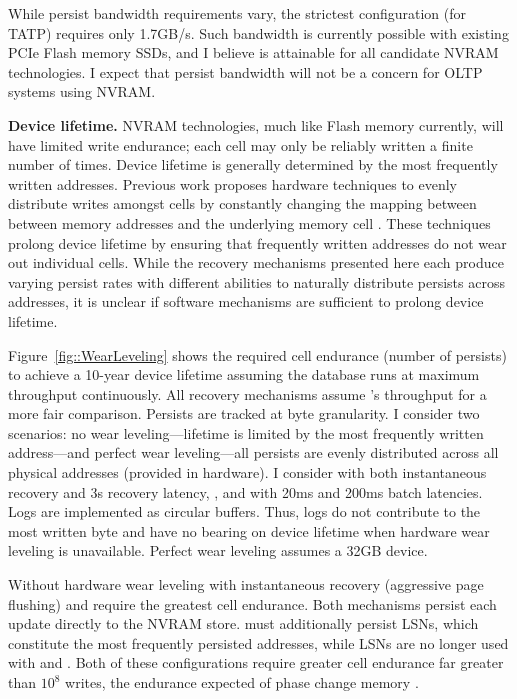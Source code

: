 While persist bandwidth requirements vary, the strictest configuration (\NVDisk for TATP) requires only 1.7GB/s.
Such bandwidth is currently possible with existing PCIe Flash memory SSDs, and I believe is attainable for all candidate NVRAM technologies.
I expect that persist bandwidth will not be a concern for OLTP systems using NVRAM.

\textbf{Device lifetime.}
NVRAM technologies, much like Flash memory currently, will have limited write endurance; each cell may only be reliably written a finite number of times.
Device lifetime is generally determined by the most frequently written addresses.
Previous work proposes hardware techniques to evenly distribute writes amongst cells by constantly changing the mapping between between memory addresses and the underlying memory cell \cite{QureshiKaridis09}.
These techniques prolong device lifetime by ensuring that frequently written addresses do not wear out individual cells.
While the recovery mechanisms presented here each produce varying persist rates with different abilities to naturally distribute persists across addresses, it is unclear if software mechanisms are sufficient to prolong device lifetime.


Figure~\ref{fig::WearLeveling} shows the required cell endurance (number of persists) to achieve a 10-year device lifetime assuming the database runs at maximum throughput continuously.
All recovery mechanisms assume \InPlace's throughput for a more fair comparison.
Persists are tracked at byte granularity.
I consider two scenarios: no wear leveling---lifetime is limited by the most frequently written address---and perfect wear leveling---all persists are evenly distributed across all physical addresses (provided in hardware).
I consider \NVDisk with both instantaneous recovery and 3s recovery latency, \InPlace, and \GroupCommit with 20ms and 200ms batch latencies.
Logs are implemented as circular buffers.
Thus, logs do not contribute to the most written byte and have no bearing on device lifetime when hardware wear leveling is unavailable.
Perfect wear leveling assumes a 32GB device.

Without hardware wear leveling \NVDisk with instantaneous recovery (aggressive page flushing) and \InPlace require the greatest cell endurance.
Both mechanisms persist each update directly to the NVRAM store.
\NVDisk must additionally persist LSNs, which constitute the most frequently persisted addresses, while LSNs are no longer used with \InPlace and \GroupCommit.
Both of these configurations require greater cell endurance far greater than $10^8$ writes, the endurance expected of phase change memory \cite{BurrKurdi08}.

